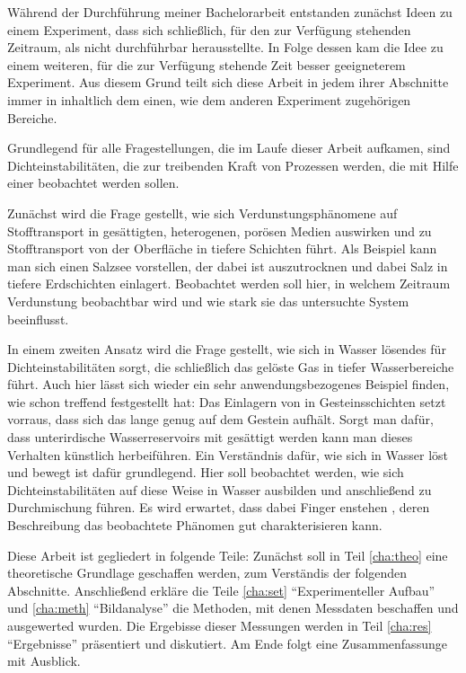 
\label{cha:intro}

Während der Durchführung meiner Bachelorarbeit entstanden zunächst Ideen zu einem Experiment, dass sich schließlich, für den zur Verfügung stehenden Zeitraum, als nicht durchführbar herausstellte.
In Folge dessen kam die Idee zu einem weiteren, für die zur Verfügung stehende Zeit besser geeigneterem Experiment. Aus diesem Grund teilt sich diese Arbeit in jedem ihrer Abschnitte immer in inhaltlich dem einen, wie dem anderen Experiment zugehörigen Bereiche.

Grundlegend für alle Fragestellungen, die im Laufe dieser Arbeit aufkamen, sind Dichteinstabilitäten, die zur treibenden Kraft von Prozessen werden, die mit Hilfe einer \HSC beobachtet werden sollen.

Zunächst wird die Frage gestellt, wie sich Verdunstungsphänomene auf Stofftransport in gesättigten, heterogenen, porösen Medien auswirken und zu Stofftransport von der Oberfläche in tiefere Schichten führt. Als Beispiel kann man sich einen Salzsee vorstellen, der dabei ist auszutrocknen und dabei Salz in tiefere Erdschichten einlagert. Beobachtet werden soll hier, in welchem Zeitraum Verdunstung beobachtbar wird und wie stark sie das untersuchte System beeinflusst.

In einem zweiten Ansatz wird die Frage gestellt, wie sich in Wasser lösendes \COT für Dichteinstabilitäten sorgt, die schließlich das gelöste Gas in tiefer Wasserbereiche führt. Auch hier lässt sich wieder ein sehr anwendungsbezogenes Beispiel finden, wie schon \cite{fernandez} treffend festgestellt hat: Das Einlagern von \COT in Gesteinsschichten setzt vorraus, dass sich das \COT lange genug auf dem Gestein aufhält. Sorgt man dafür, dass unterirdische Wasserreservoirs mit \COT gesättigt werden kann man dieses Verhalten künstlich herbeiführen. Ein Verständnis dafür, wie sich \COT in Wasser löst und bewegt ist dafür grundlegend. Hier soll beobachtet werden, wie sich Dichteinstabilitäten auf diese Weise in Wasser ausbilden und anschließend zu Durchmischung führen. Es wird erwartet, dass dabei Finger enstehen , deren Beschreibung das beobachtete Phänomen gut charakterisieren kann.

Diese Arbeit ist gegliedert in folgende Teile: Zunächst soll in Teil \ref{cha:theo} eine theoretische Grundlage geschaffen werden, zum Verständis der folgenden Abschnitte. Anschließend erkläre die Teile \ref{cha:set} "`Experimenteller Aufbau"' und \ref{cha:meth} "`Bildanalyse"' die Methoden, mit denen Messdaten beschaffen und ausgewerted wurden. Die Ergebisse dieser Messungen werden in Teil \ref{cha:res} "`Ergebnisse"' präsentiert und diskutiert. Am Ende folgt eine Zusammenfassunge mit Ausblick.

